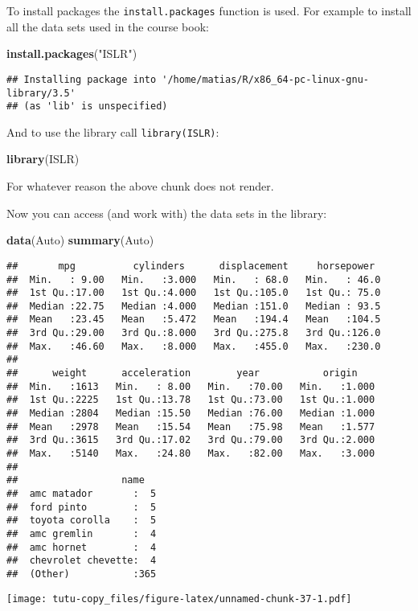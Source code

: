 \documentclass[]{article}
\newenvironment{Shaded}{\begin{snugshade}}{\end{snugshade}}
\newcommand{\KeywordTok}[1]{\textcolor[rgb]{0.13,0.29,0.53}{\textbf{#1}}}
\newcommand{\StringTok}[1]{\textcolor[rgb]{0.31,0.60,0.02}{#1}}
\newcommand{\OperatorTok}[1]{\textcolor[rgb]{0.81,0.36,0.00}{\textbf{#1}}}
\newcommand{\NormalTok}[1]{#1}
\begin{document}
To install packages the \texttt{install.packages} function is used. For
example to install all the data sets used in the course book:

\begin{Shaded}
\begin{Highlighting}[]
\KeywordTok{install.packages}\NormalTok{(}\StringTok{"ISLR"}\NormalTok{)}
\end{Highlighting}
\end{Shaded}

\begin{verbatim}
## Installing package into '/home/matias/R/x86_64-pc-linux-gnu-library/3.5'
## (as 'lib' is unspecified)
\end{verbatim}

And to use the library call \texttt{library(ISLR)}:

\begin{Shaded}
\begin{Highlighting}[]
\KeywordTok{library}\NormalTok{(ISLR)}
\end{Highlighting}
\end{Shaded}

For whatever reason the above chunk does not render.

Now you can access (and work with) the data sets in the library:

\begin{Shaded}
\begin{Highlighting}[]
\KeywordTok{data}\NormalTok{(Auto)}
\KeywordTok{summary}\NormalTok{(Auto)}
\end{Highlighting}
\end{Shaded}

\begin{verbatim}
##       mpg          cylinders      displacement     horsepower   
##  Min.   : 9.00   Min.   :3.000   Min.   : 68.0   Min.   : 46.0  
##  1st Qu.:17.00   1st Qu.:4.000   1st Qu.:105.0   1st Qu.: 75.0  
##  Median :22.75   Median :4.000   Median :151.0   Median : 93.5  
##  Mean   :23.45   Mean   :5.472   Mean   :194.4   Mean   :104.5  
##  3rd Qu.:29.00   3rd Qu.:8.000   3rd Qu.:275.8   3rd Qu.:126.0  
##  Max.   :46.60   Max.   :8.000   Max.   :455.0   Max.   :230.0  
##                                                                 
##      weight      acceleration        year           origin     
##  Min.   :1613   Min.   : 8.00   Min.   :70.00   Min.   :1.000  
##  1st Qu.:2225   1st Qu.:13.78   1st Qu.:73.00   1st Qu.:1.000  
##  Median :2804   Median :15.50   Median :76.00   Median :1.000  
##  Mean   :2978   Mean   :15.54   Mean   :75.98   Mean   :1.577  
##  3rd Qu.:3615   3rd Qu.:17.02   3rd Qu.:79.00   3rd Qu.:2.000  
##  Max.   :5140   Max.   :24.80   Max.   :82.00   Max.   :3.000  
##                                                                
##                  name    
##  amc matador       :  5  
##  ford pinto        :  5  
##  toyota corolla    :  5  
##  amc gremlin       :  4  
##  amc hornet        :  4  
##  chevrolet chevette:  4  
##  (Other)           :365
\end{verbatim}

\begin{Shaded}
\end{Shaded}

\texttt{[image: tutu-copy\_files/figure-latex/unnamed-chunk-37-1.pdf]}
\end{document}
